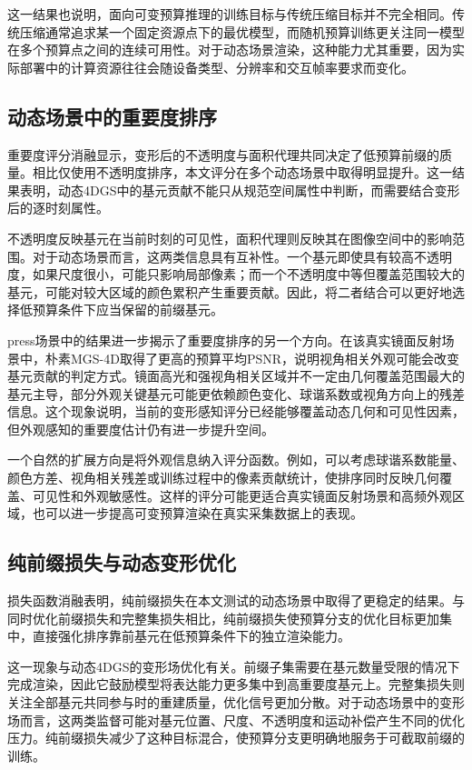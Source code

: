 \documentclass[sn-mathphys]{sn-jnl}
\begin{document}
这一结果也说明，面向可变预算推理的训练目标与传统压缩目标并不完全相同。传统压缩通常追求某一个固定资源点下的最优模型，而随机预算训练更关注同一模型在多个预算点之间的连续可用性。对于动态场景渲染，这种能力尤其重要，因为实际部署中的计算资源往往会随设备类型、分辨率和交互帧率要求而变化。

\subsection{动态场景中的重要度排序}

重要度评分消融显示，变形后的不透明度与面积代理共同决定了低预算前缀的质量。相比仅使用不透明度排序，本文评分在多个动态场景中取得明显提升。这一结果表明，动态4DGS中的基元贡献不能只从规范空间属性中判断，而需要结合变形后的逐时刻属性。

不透明度反映基元在当前时刻的可见性，面积代理则反映其在图像空间中的影响范围。对于动态场景而言，这两类信息具有互补性。一个基元即使具有较高不透明度，如果尺度很小，可能只影响局部像素；而一个不透明度中等但覆盖范围较大的基元，可能对较大区域的颜色累积产生重要贡献。因此，将二者结合可以更好地选择低预算条件下应当保留的前缀基元。

press场景中的结果进一步揭示了重要度排序的另一个方向。在该真实镜面反射场景中，朴素MGS-4D取得了更高的预算平均PSNR，说明视角相关外观可能会改变基元贡献的判定方式。镜面高光和强视角相关区域并不一定由几何覆盖范围最大的基元主导，部分外观关键基元可能更依赖颜色变化、球谐系数或视角方向上的残差信息。这个现象说明，当前的变形感知评分已经能够覆盖动态几何和可见性因素，但外观感知的重要度估计仍有进一步提升空间。

一个自然的扩展方向是将外观信息纳入评分函数。例如，可以考虑球谐系数能量、颜色方差、视角相关残差或训练过程中的像素贡献统计，使排序同时反映几何覆盖、可见性和外观敏感性。这样的评分可能更适合真实镜面反射场景和高频外观区域，也可以进一步提高可变预算渲染在真实采集数据上的表现。

\subsection{纯前缀损失与动态变形优化}

损失函数消融表明，纯前缀损失在本文测试的动态场景中取得了更稳定的结果。与同时优化前缀损失和完整集损失相比，纯前缀损失使预算分支的优化目标更加集中，直接强化排序靠前基元在低预算条件下的独立渲染能力。

这一现象与动态4DGS的变形场优化有关。前缀子集需要在基元数量受限的情况下完成渲染，因此它鼓励模型将表达能力更多集中到高重要度基元上。完整集损失则关注全部基元共同参与时的重建质量，优化信号更加分散。对于动态场景中的变形场而言，这两类监督可能对基元位置、尺度、不透明度和运动补偿产生不同的优化压力。纯前缀损失减少了这种目标混合，使预算分支更明确地服务于可截取前缀的训练。
\end{document}
